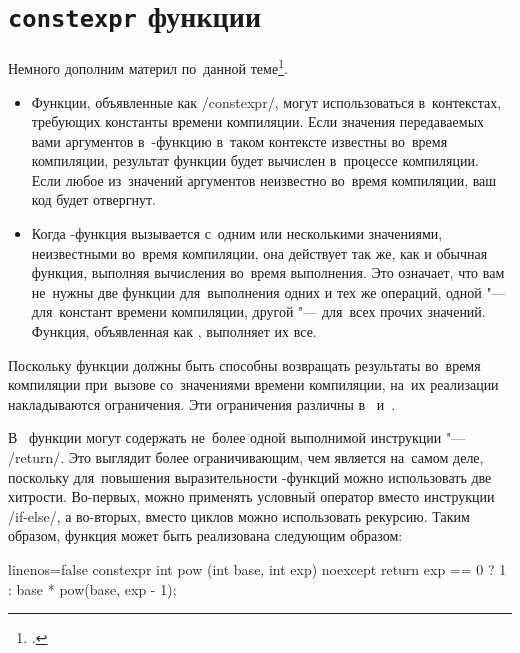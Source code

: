 \section{\texttt{constexpr} функции}
Немного дополним материл  по~данной теме\footcite[раздел 3.9]{Meyers:2016:ru}.

\begin{itemize}[itemindent=*, leftmargin=0pt]
    \item Функции, объявленные как \cppinline/constexpr/, могут использоваться в~контекстах, требующих константы времени компиляции. Если значения передаваемых вами аргументов в~-функцию в~таком контексте известны во~время компиляции, результат функции будет вычислен в~процессе компиляции. Если любое из~значений аргументов неизвестно во~время компиляции, ваш код будет отвергнут.

    \item Когда -функция вызывается с~одним или несколькими значениями, неизвестными во~время компиляции, она действует так же, как и обычная функция, выполняя вычисления во~время выполнения. Это означает, что вам не~нужны две функции для~выполнения одних и тех же операций, одной "--- для~констант времени компиляции, другой "--- для~всех прочих значений. Функция, объявленная как
    , выполняет их все.
\end{itemize}

Поскольку функции  должны быть способны возвращать результаты во~время компиляции при~вызове со~значениями времени компиляции, на~их реализации накладываются ограничения. Эти ограничения различны в~ и~.

В~ функции  могут содержать не~более одной выполнимой инструкции "--- \cppinline/return/. Это выглядит более ограничивающим, чем является на~самом деле, поскольку для~повышения выразительности -функций можно использовать две хитрости. Во-первых, можно применять условный оператор  вместо инструкции \cppinline/if-else/, а во-вторых, вместо циклов можно использовать рекурсию. Таким образом, функция  может быть реализована следующим образом:

\begin{cppcode*}{linenos=false}
constexpr int pow (int base, int exp) noexcept
{
  return exp == 0 ? 1 : base * pow(base, exp - 1);
}
\end{cppcode*}

